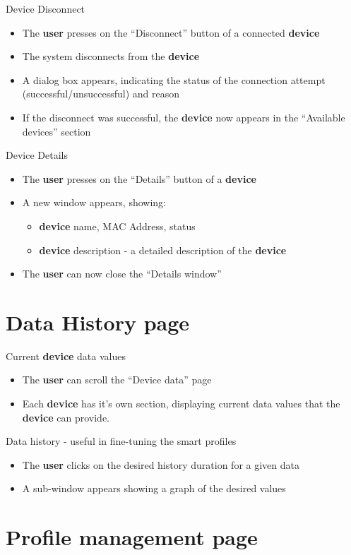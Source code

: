 Device Disconnect
\begin{itemize}
\item The \textbf{user} presses on the “Disconnect” button of a connected \textbf{device}
\item The system disconnects from the \textbf{device}
\item A dialog box appears, indicating the status of the connection attempt (successful/unsuccessful) and reason
\item If the disconnect was successful, the \textbf{device} now appears in the “Available devices” section
\end{itemize}

Device Details
\begin{itemize}
\item The \textbf{user} presses on the “Details” button of a \textbf{device}
\item A new window appears, showing:
\begin{itemize}
\item \textbf{device} name, MAC Address, status
\item \textbf{device} description - a detailed description of the \textbf{device}
\end{itemize}
\item The \textbf{user} can now close the “Details window”
\end{itemize}

\section{Data History page}

Current \textbf{device} data values
\begin{itemize}
\item The \textbf{user} can scroll the “Device data” page
\item Each \textbf{device} has it’s own section, displaying current data values that the \textbf{device} can provide.
\end{itemize}

Data history - useful in fine-tuning the smart profiles
\begin{itemize}
\item The \textbf{user} clicks on the desired history duration for a given data
\item A sub-window appears showing a graph of the desired values
\end{itemize}

\section{Profile management page}

